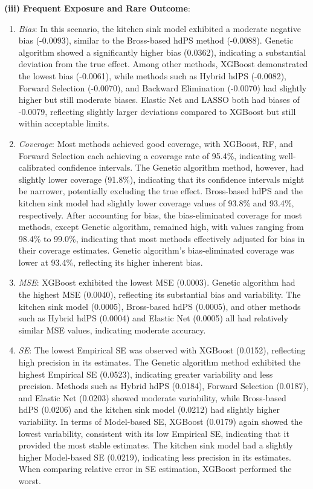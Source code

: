 \documentclass[10pt,letterpaper]{article}
\begin{document}
\textbf{(iii) Frequent Exposure and Rare Outcome}:

\begin{enumerate}
\def\labelenumi{\arabic{enumi}.}
\item
  \emph{Bias}: In this scenario, the kitchen sink model exhibited a
  moderate negative bias (-0.0093), similar to the Bross-based hdPS
  method (-0.0088). Genetic algorithm showed a significantly higher bias
  (0.0362), indicating a substantial deviation from the true effect.
  Among other methods, XGBoost demonstrated the lowest bias (-0.0061),
  while methods such as Hybrid hdPS (-0.0082), Forward Selection
  (-0.0070), and Backward Elimination (-0.0070) had slightly higher but
  still moderate biases. Elastic Net and LASSO both had biases of
  -0.0079, reflecting slightly larger deviations compared to XGBoost but
  still within acceptable limits.
\item
  \emph{Coverage}: Most methods achieved good coverage, with XGBoost,
  RF, and Forward Selection each achieving a coverage rate of 95.4\%,
  indicating well-calibrated confidence intervals. The Genetic algorithm
  method, however, had slightly lower coverage (91.8\%), indicating that
  its confidence intervals might be narrower, potentially excluding the
  true effect. Bross-based hdPS and the kitchen sink model had slightly
  lower coverage values of 93.8\% and 93.4\%, respectively. After
  accounting for bias, the bias-eliminated coverage for most methods,
  except Genetic algorithm, remained high, with values ranging from
  98.4\% to 99.0\%, indicating that most methods effectively adjusted
  for bias in their coverage estimates. Genetic algorithm's
  bias-eliminated coverage was lower at 93.4\%, reflecting its higher
  inherent bias.
\item
  \emph{MSE}: XGBoost exhibited the lowest MSE (0.0003). Genetic
  algorithm had the highest MSE (0.0040), reflecting its substantial
  bias and variability. The kitchen sink model (0.0005), Bross-based
  hdPS (0.0005), and other methods such as Hybrid hdPS (0.0004) and
  Elastic Net (0.0005) all had relatively similar MSE values, indicating
  moderate accuracy.
\item
  \emph{SE}: The lowest Empirical SE was observed with XGBoost (0.0152),
  reflecting high precision in its estimates. The Genetic algorithm
  method exhibited the highest Empirical SE (0.0523), indicating greater
  variability and less precision. Methods such as Hybrid hdPS (0.0184),
  Forward Selection (0.0187), and Elastic Net (0.0203) showed moderate
  variability, while Bross-based hdPS (0.0206) and the kitchen sink
  model (0.0212) had slightly higher variability. In terms of
  Model-based SE, XGBoost (0.0179) again showed the lowest variability,
  consistent with its low Empirical SE, indicating that it provided the
  most stable estimates. The kitchen sink model had a slightly higher
  Model-based SE (0.0219), indicating less precision in its estimates.
  When comparing relative error in SE estimation, XGBoost performed the
  worst.
\end{enumerate}
\end{document}

